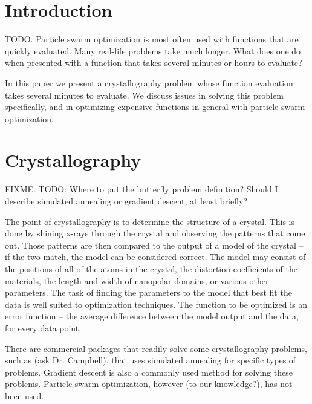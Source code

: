 \documentclass[letterpaper]{sig-alternate}
\begin{document}



\section{Introduction}
\label{sec:intro}

TODO.
Particle swarm optimization is most often used with functions that are quickly
evaluated.  Many real-life problems take much longer.  What does one do when 
presented with a function that takes several minutes or hours to evaluate?  

In this paper we present a crystallography problem whose function evaluation
takes several minutes to evaluate.  We discuss issues in solving this problem
specifically, and in optimizing expensive functions in general with particle 
swarm optimization.


\section{Crystallography}
\label{sec:crystallography}

FIXME.
TODO: Where to put the butterfly problem definition? Should I describe 
simulated annealing or gradient descent, at least briefly?

The point of crystallography is to determine the structure of a crystal.  This
is done by shining x-rays through the crystal and observing the patterns that
come out.  Those patterns are then compared to the output of a model of the 
crystal -- if the two match, the model can be considered correct.  The model
may consist of the positions of all of the atoms in the crystal, the 
distortion coefficients of the materials, the length and width of nanopolar
domains, or various other parameters.  The task of finding the parameters to 
the model that best fit the data is well suited to optimization techniques.  
The function to be optimized is an error function -- the average difference
between the model output and the data, for every data point.

There are commercial packages that readily solve some crystallography problems,
such as (ask Dr. Campbell), that uses simulated annealing for specific types 
of problems.  Gradient descent is also a commonly used method for solving these
problems.  Particle swarm optimization, however (to our knowledge?), has not 
been used.  
\end{document}
